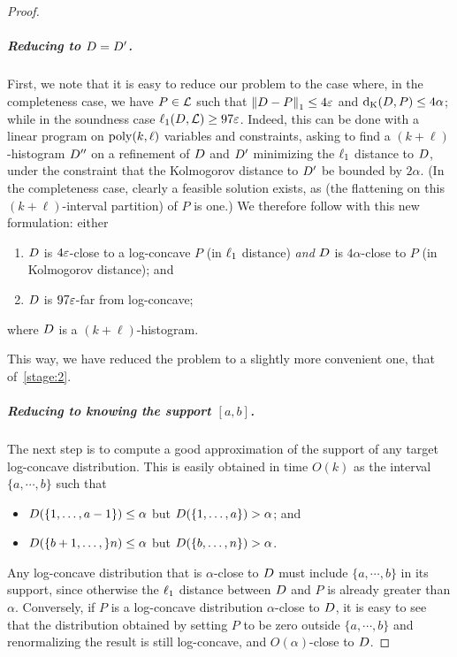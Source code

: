 \begin{proof}
\subparagraph{Reducing to $\D=\D^\prime$.}
First, we note that it is easy to reduce our problem to the case where, in the completeness case, we have $P\in\classlog$ such that $\normone{\D-P} \leq 4\eps$  and $\kolmogorov{\D}{P} \leq 4\alpha$; while in the soundness case $\lp[1](\D,\classlog) \geq 97\eps$. Indeed, this can be done with a linear program on $\poly(k,\ell)$ variables and constraints, asking to find a $(k+\ell)$-histogram $\D^{\prime\prime}$ on a refinement of $\D$ and $\D^\prime$ minimizing the $\lp[1]$ distance to $\D$, under the constraint that the Kolmogorov distance to $\D^\prime$ be bounded by $2\alpha$. (In the completeness case, clearly a feasible solution exists, as (the flattening on this $(k+\ell)$-interval partition) of $P$ is one.) We therefore follow with this new formulation: either
  \begin{enumerate}[\sf(a)]
    \item $\D$ is $4\eps$-close to a log-concave $P$ (in $\lp[1]$ distance) \emph{and} $\D$ is $4\alpha$-close to $P$ (in Kolmogorov distance); and
    \item $\D$ is $97\eps$-far from log-concave;
  \end{enumerate} 
where $\D$ is a $(k+\ell)$-histogram.\medskip

\noindent This way, we have reduced the problem to a slightly more convenient one, that of~\cref{stage:2}.

\subparagraph{Reducing to knowing the support $[a,b]$.}
The next step is to compute a good approximation of the support of any target log-concave distribution. This is easily obtained in time $O(k)$ as the interval $\{a,\cdots,b\}$ such that
\begin{itemize}
  \item $\D(\{1,\dots,a-1\}) \leq \alpha$ but $\D(\{1,\dots,a\}) > \alpha$; and
  \item $\D(\{b+1,\dots,\}n) \leq \alpha$ but $\D(\{b,\dots,n\}) > \alpha$.
\end{itemize} 
Any log-concave distribution that is $\alpha$-close to $\D$ must include  $\{a,\cdots,b\}$ in its support, since otherwise the $\lp[1]$ distance between $\D$ and $P$ is already greater than $\alpha$. Conversely, if $P$ is a log-concave distribution $\alpha$-close to $\D$, it is easy to see that the distribution obtained by setting $P$ to be zero outside $\{a,\cdots,b\}$ and renormalizing the result is still log-concave, and $O(\alpha)$-close to $\D$.


\end{proof}
